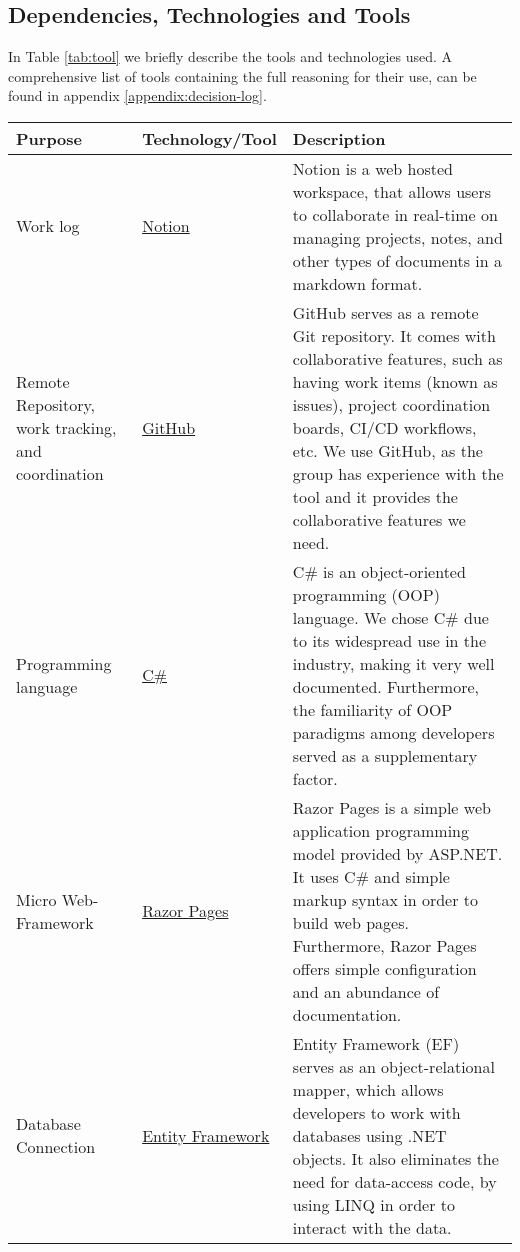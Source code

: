
\subsection{Dependencies, Technologies and Tools}


In Table \ref{tab:tool} we briefly describe the tools and technologies used. A comprehensive list of tools containing the full reasoning for their use, can be found in appendix \ref{appendix:decision-log}.

\begin{longtable}{|p{}|p{} | p{}|}
    \hline
    \textbf{Purpose} & \textbf{Technology/Tool} & \textbf{Description}\\
    \hline
    Work log & \href{https://www.notion.so/help/guides/category/documentation}{Notion} & Notion is a web hosted workspace, that allows users to collaborate in real-time on managing projects, notes, and other types of documents in a markdown format.\\
    \hline
    Remote Repository, work tracking, and coordination & \href{https://github.com/features}{GitHub} & GitHub serves as a remote Git repository. It comes with collaborative features, such as having work items (known as issues), project coordination boards, CI/CD workflows, etc. We use GitHub, as the group has experience with the tool and it provides the collaborative features we need.\\
    \hline
    Programming language & \href{https://learn.microsoft.com/en-us/dotnet/csharp/}{C\#} &
    C\# is an object-oriented programming (OOP) language. We chose C\# due to its widespread use in the industry, making it very well documented. Furthermore, the familiarity of OOP paradigms among developers served as a supplementary factor.\\
    \hline
    Micro Web-Framework & \href{https://learn.microsoft.com/en-us/aspnet/core/razor-pages/?view=aspnetcore-8.0&tabs=visual-studio}{Razor Pages} & Razor Pages is a simple web application programming model provided by ASP.NET. It uses C\# and simple markup syntax in order to build web pages. Furthermore, Razor Pages offers simple configuration and an abundance of documentation.\\
    \hline
    Database Connection & \href{https://learn.microsoft.com/en-us/ef/core/}{Entity Framework} & Entity Framework (EF) serves as an object-relational mapper, which allows developers to work with databases using .NET objects. It also eliminates the need for data-access code, by using LINQ in order to interact with the data.\\

\end{longtable}
